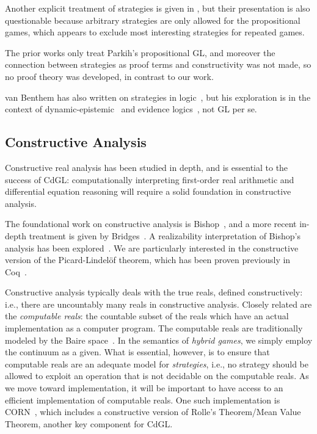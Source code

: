 \documentclass[12pt]{cmuthesis}
\theoremstyle{definition}
\theoremstyle{remark}
\newcommand{\CdGL}{\textsf{CdGL}\xspace}
\begin{document}
Another explicit treatment of strategies is given in \cite{DBLP:conf/kr/RamanujamS08}, but their presentation is also questionable because arbitrary strategies are only allowed for the propositional games, which appears to exclude most interesting strategies for repeated games.

The prior works only treat Parkih's propositional GL, and moreover the connection between strategies as proof terms and constructivity was not made, so no proof theory was developed, in contrast to our work.

van Benthem has also written on strategies in logic~\cite{DBLP:series/lncs/Benthem15}, but his exploration is in the context of dynamic-epistemic~\cite{DBLP:journals/games/BenthemPR11,van2001games} and evidence logics~\cite{DBLP:journals/sLogica/BenthemP11}, not GL per se.

\subsection{Constructive Analysis}
Constructive real analysis has been studied in depth, and is essential to the success of \CdGL: computationally interpreting first-order real arithmetic and differential equation reasoning will require a solid foundation in constructive analysis.

The foundational work on constructive analysis is Bishop~\cite{bishop1967foundations}, and a more recent in-depth treatment is given by Bridges~\cite{bridges2007techniques}.
A realizability interpretation of Bishop's analysis has been explored~\cite{DBLP:journals/mst/Schwichtenberg08}.
We are particularly interested in the constructive version of the Picard-Lindel\"{o}f theorem, which has been proven previously in Coq~\cite{DBLP:conf/itp/MakarovS13}.

Constructive analysis typically deals with the true reals, defined constructively: i.e., there are uncountably many reals in constructive analysis.
Closely related are the \emph{computable reals}: the countable subset of the reals which have an actual implementation as a computer program.
The computable reals are traditionally modeled by the Baire space~\cite{CM_1968__20__194_0}.
In the semantics of \emph{hybrid games}, we simply employ the continuum as a given.
What is essential, however, is to ensure that computable reals are an adequate model for \emph{strategies}, i.e., no strategy should be allowed to exploit an operation that is not decidable on the computable reals.
As we move toward implementation, it will be important to have access to an efficient implementation of computable reals.
One such implementation is CORN~\cite{Krebbers+Spitters:lmcs:corn:2011}, which includes a constructive version of Rolle's Theorem/Mean Value Theorem, another key component for \CdGL.
\end{document}
